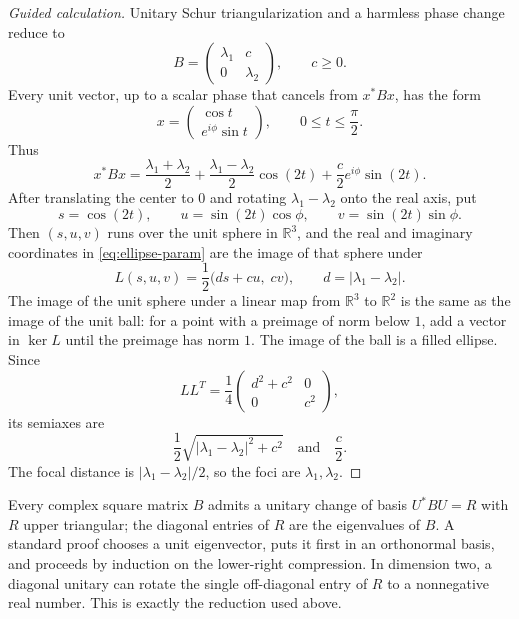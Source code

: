 \documentclass[11pt,oneside,openany]{book}
\theoremstyle{definition}
\theoremstyle{remark}
\newcommand{\R}{\mathbb R}
\begin{document}
\begin{proof}[Guided calculation]
Unitary Schur triangularization and a harmless phase change reduce to
\[
  B=\begin{pmatrix}\lambda_1&c\\0&\lambda_2\end{pmatrix},
  \qquad c\geq0.
\]
Every unit vector, up to a scalar phase that cancels from \(x^*Bx\),
has the form
\[
  x=\begin{pmatrix}\cos t\\e^{i\phi}\sin t\end{pmatrix},
  \qquad 0\leq t\leq\frac{\pi}{2}.
\]
Thus
\begin{equation}
  x^*Bx=
  \frac{\lambda_1+\lambda_2}{2}
  +\frac{\lambda_1-\lambda_2}{2}\cos(2t)
  +\frac{c}{2}e^{i\phi}\sin(2t).
  \label{eq:ellipse-param}
\end{equation}
After translating the center to \(0\) and rotating
\(\lambda_1-\lambda_2\) onto the real axis, put
\[
  s=\cos(2t),\qquad
  u=\sin(2t)\cos\phi,\qquad
  v=\sin(2t)\sin\phi.
\]
Then \((s,u,v)\) runs over the unit sphere in \(\R^3\), and the real
and imaginary coordinates in \eqref{eq:ellipse-param} are the image
of that sphere under
\[
  L(s,u,v)=\frac12\bigl(ds+cu,\;cv\bigr),
  \qquad d=|\lambda_1-\lambda_2|.
\]
The image of the unit sphere under a linear map from \(\R^3\) to
\(\R^2\) is the same as the image of the unit ball: for a point with a
preimage of norm below \(1\), add a vector in \(\ker L\) until the
preimage has norm \(1\).  The image of the ball is a filled ellipse.
Since
\[
  LL^T=\frac14
  \begin{pmatrix}d^2+c^2&0\\0&c^2\end{pmatrix},
\]
its semiaxes are
\[
  \frac12\sqrt{|\lambda_1-\lambda_2|^2+c^2}
  \quad\text{and}\quad
  \frac c2.
\]
The focal distance is \(|\lambda_1-\lambda_2|/2\), so the foci are
\(\lambda_1,\lambda_2\).
\end{proof}

\begin{blackbox}
Every complex square matrix \(B\) admits a unitary change of basis
\(U^*BU=R\) with \(R\) upper triangular; the diagonal entries of \(R\)
are the eigenvalues of \(B\).  A standard proof chooses a unit
eigenvector, puts it first in an orthonormal basis, and proceeds by
induction on the lower-right compression.  In dimension two, a
diagonal unitary can rotate the single off-diagonal entry of \(R\) to
a nonnegative real number.  This is exactly the reduction used above.
\end{blackbox}
\end{document}
